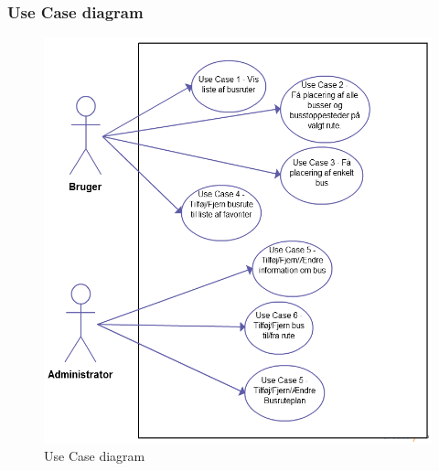 \subsubsection{Use Case diagram}

\begin{figure}[h]
\centering
\includegraphics[scale=0.5]{Use_Cases/Diagrammer/Use_Case_Diagram.jpg} 
\caption{Use Case diagram}
\label{usecasediagram}
\end{figure}
